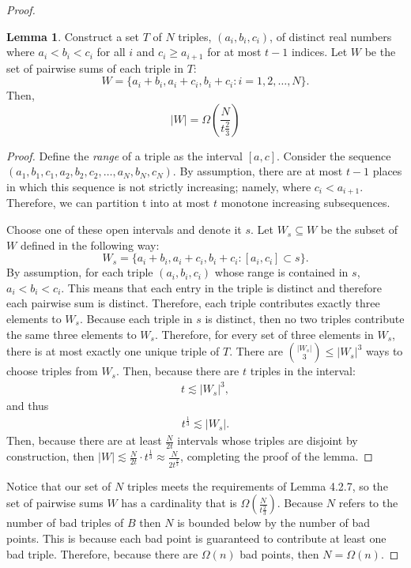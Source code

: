 \documentclass{scrippsthesisclass}
\theoremstyle{definition}
\newtheorem{lemma}[theorem]{Lemma}
\begin{document}
\begin{proof}
\begin{lemma}
    Construct a set $T$ of $N$ triples, $(a_i, b_i, c_i)$, of distinct real numbers where $a_i < b_i < c_i$ for all $i$ and $c_i \geq a_{i+1}$ for at most $t - 1$ indices. 
    Let $W$ be the set of pairwise sums of each triple in $T$:
    \[
    W = \{a_i + b_i, a_i + c_i, b_i + c_i : i = 1, 2, \dots, N\}.
    \]
    Then, 
    \[
    |W| = \Omega\left(\frac{N}{t{\frac{2}{3}}}\right)
    \]
    \begin{proof}
        Define the \textit{range} of a triple as the interval $[a, c]$.
        Consider the sequence $(a_1, b_1, c_1, a_2, b_2, c_2, \dots, a_N, b_N, c_N)$.
        By assumption, there are at most  $t - 1$ places in which this sequence is not strictly increasing; namely, where $c_{i} < a_{i+1}$. 
        Therefore, we can partition t into at most $t$ monotone increasing subsequences. 

        Choose one of these open intervals and denote it $s$. 
        Let $W_s \subseteq W$ be the subset of $W$ defined in the following way:
        \[
        W_s = \{a_i + b_i, a_i + c_i, b_i + c_i : [a_i, c_i] \subset s\}.
        \]
        By assumption, for each triple $(a_i, b_i, c_i)$ whose range is contained in $s$, $a_i < b_i < c_i$.
        This means that each entry in the triple is distinct and therefore each pairwise sum is distinct. 
        Therefore, each triple contributes exactly three elements to $W_s$. 
        Because each triple in $s$ is distinct, then no two triples contribute the same three elements to $W_s$. 
        Therefore, for every set of three elements in $W_s$, there is at most exactly one unique triple of $T$. 
        There are ${|W_s| \choose 3} \leq |W_s|^3$ ways to choose triples from $W_s$. 
        Then, because there are $t$ triples in the interval:
        \begin{align}
            t \lesssim |W_s|^3,
        \end{align}
        and thus 
        \begin{align}
            t^{\frac{1}{3}} \lesssim |W_s|.
        \end{align}
        Then, because there are at least $\frac{N}{2t}$ intervals whose triples are disjoint by construction, then $|W| \lesssim \frac{N}{2t} \cdot t^{\frac{1}{3}} \approx \frac{N}{2t^{\frac{2}{3}}}$, completing the proof of the lemma. 
    \end{proof}
\end{lemma}

Notice that our set of $N$ triples meets the requirements of Lemma 4.2.7, so the set of pairwise sums $W$ has a cardinality that is $\Omega\left(\frac{N}{t{\frac{2}{3}}}\right)$.
Because $N$ refers to the number of bad triples of $B$ then $N$ is bounded below by the number of bad points.
This is because each bad point is guaranteed to contribute at least one bad triple. 
Therefore, because there are $\Omega(n)$ bad points, then $N = \Omega(n)$.


\end{proof}
\end{document}
